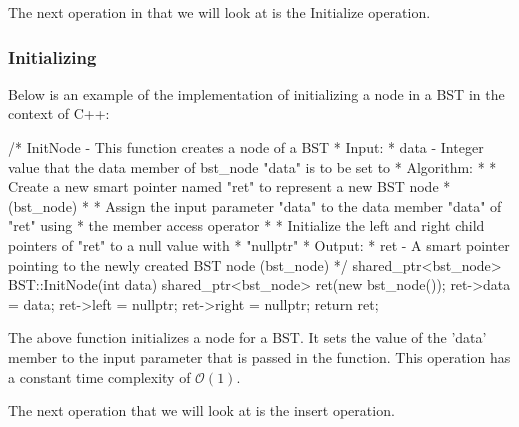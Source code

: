 The next operation in that we will look at is the Initialize operation.

\begin{highlight}

\subsubsection*{Initializing}

Below is an example of the implementation of initializing a node in a BST in the context of C++:

\begin{code}
/*  InitNode - This function creates a node of a BST
*   Input:
*     data - Integer value that the data member of bst_node "data" is to be set to
*   Algorithm:
*     * Create a new smart pointer named "ret" to represent a new BST node 
*       (bst_node)
*     * Assign the input parameter "data" to the data member "data" of "ret" using 
*       the member access operator
*     * Initialize the left and right child pointers of "ret" to a null value with 
*       "nullptr"
*   Output:
*     ret - A smart pointer pointing to the newly created BST node (bst_node)
*/
shared_ptr<bst_node> BST::InitNode(int data){
    shared_ptr<bst_node> ret(new bst_node());
    ret->data = data;
    ret->left = nullptr;
    ret->right = nullptr;
    return ret;
}
\end{code}

The above function initializes a node for a BST. It sets the value of the 'data' member to the input parameter that is passed in the function. This operation has a constant time complexity of 
$\mathcal{O}(1)$.

\end{highlight}

The next operation that we will look at is the insert operation.

